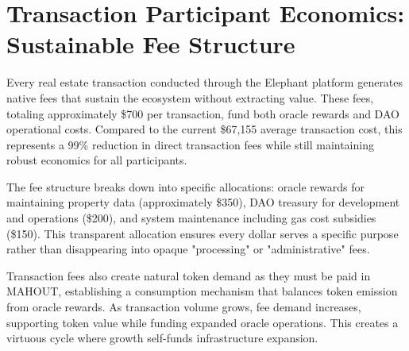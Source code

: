 \section{Transaction Participant Economics: Sustainable Fee Structure}

Every real estate transaction conducted through the Elephant platform generates native fees that sustain the ecosystem without extracting value. These fees, totaling approximately \$700 per transaction, fund both oracle rewards and DAO operational costs. Compared to the current \$67,155 average transaction cost, this represents a 99\% reduction in direct transaction fees while still maintaining robust economics for all participants.

The fee structure breaks down into specific allocations: oracle rewards for maintaining property data (approximately \$350), DAO treasury for development and operations (\$200), and system maintenance including gas cost subsidies (\$150). This transparent allocation ensures every dollar serves a specific purpose rather than disappearing into opaque "processing" or "administrative" fees.

Transaction fees also create natural token demand as they must be paid in MAHOUT, establishing a consumption mechanism that balances token emission from oracle rewards. As transaction volume grows, fee demand increases, supporting token value while funding expanded oracle operations. This creates a virtuous cycle where growth self-funds infrastructure expansion.

